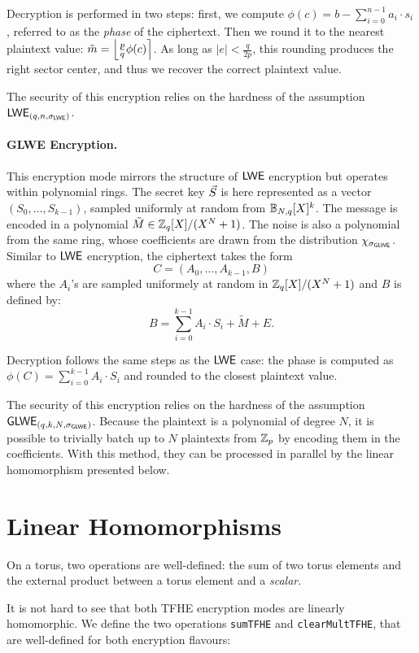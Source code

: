 Decryption is performed in two steps: first, we compute $\phi(c) = b - \sum_{i=0}^{n - 1} a_i \cdot s_i$, referred to as the \emph{phase} of the ciphertext. Then we round it to the nearest plaintext value: $\tilde m = \left \lfloor \frac p q \phi(c) \right \rceil$. As long as $|e| < \frac{q}{2p}$, this rounding produces the right sector center, and thus we recover the correct plaintext value.

The security of this encryption relies on the hardness of the assumption $\textsf{LWE}_{(q, n, \sigma_{\textsf{LWE}})}$. 



\paragraph{GLWE Encryption.} This encryption mode mirrors the structure of $\textsf{LWE}$ encryption but operates within polynomial rings. The secret key $\vec S$ is here represented as a vector $(S_0, \dots, S_{k-1})$, sampled uniformly at random from $\mathbb{B}_{N, q}[X]^k$. 
%
The message is encoded in a polynomial $\tilde M \in \mathbb{Z}_q[X] / (X^N + 1)$. The noise is also a polynomial from the same ring, whose coefficients are drawn from the distribution $\chi_{\sigma_{\textsf{GLWE}}}$.
%
Similar to $\textsf{LWE}$ encryption, the ciphertext takes the form \[C = (A_0, \dots, A_{k-1}, B)\] where the $A_i$'s are sampled uniformely at random in $\mathbb{Z}_q[X] / (X^N + 1)$ and $B$ is defined by: \[B = \sum_{i=0}^{k-1} A_i \cdot S_i + \tilde M + E.\]
%

Decryption follows the same steps as the $\textsf{LWE}$ case: the phase is computed as $\phi(C) = \sum_{i=0}^{k-1} A_i \cdot S_i$ and rounded to the closest plaintext value.


The security of this encryption relies on the hardness of the assumption $\textsf{GLWE}_{(q, k, N, \sigma_{\textsf{GLWE}})}$. Because the plaintext is a polynomial of degree $N$, it is possible to trivially batch up to $N$ plaintexts from $\mathbb{Z}_p$ by encoding them in the coefficients. With this method, they can be processed in parallel by the linear homomorphism presented below.




\section{Linear Homomorphisms}

On a torus, two operations are well-defined: the sum of two torus elements and the external product between a torus element and a \textit{scalar}.

It is not hard to see that both TFHE encryption modes are linearly homomorphic. We define the two operations \texttt{sumTFHE} and \texttt{clearMultTFHE}, that are well-defined for both encryption flavours:


